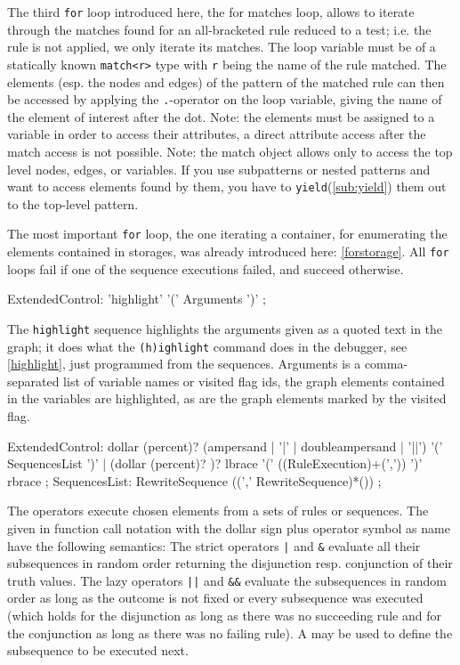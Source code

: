 The third \texttt{for} loop introduced here, the for matches loop, allows to iterate through the matches found for an all-bracketed rule reduced to a test; i.e. the rule is not applied, we only iterate its matches.
The loop variable must be of a statically known \texttt{match<r>} type with \texttt{r} being the name of the rule matched.
The elements (esp. the nodes and edges) of the pattern of the matched rule can then be accessed by applying the \texttt{.}-operator on the loop variable, giving the name of the element of interest after the dot.
Note: the elements must be assigned to a variable in order to access their attributes, a direct attribute access after the match access is not possible.
Note: the match object allows only to access the top level nodes, edges, or variables.
If you use subpatterns or nested patterns and want to access elements found by them, you have to \texttt{yield}(\ref{sub:yield}) them out to the top-level pattern.

The most important \texttt{for} loop, the one iterating a container, for enumerating the elements contained in storages, was already introduced here: \ref{forstorage}.
All \texttt{for} loops fail if one of the sequence executions failed, and succeed otherwise.

\begin{rail}
  ExtendedControl:
		'highlight' '(' Arguments ')'
    ;
\end{rail}
The \texttt{highlight} sequence highlights the arguments given as a quoted text in the graph;
it does what the \texttt{(h)ighlight} command does in the debugger, see \ref{highlight}, just programmed from the sequences. 
Arguments is a comma-separated list of variable names or visited flag ids, the graph elements contained in the variables are highlighted, as are the graph elements marked by the visited flag.

\begin{rail} 
  ExtendedControl: 
	dollar (percent)? (ampersand | '|' | doubleampersand | '||') '(' SequencesList ')' |
	(dollar (percent)? )? lbrace '(' ((RuleExecution)+(',')) ')' rbrace
	;
  SequencesList:
	RewriteSequence ((',' RewriteSequence)*())
	;
\end{rail}

The  operators execute chosen elements from a sets of rules or sequences.
The  given in function call notation with the dollar sign plus operator symbol as name have the following semantics:
The strict operators \verb/|/ and \verb/&/ evaluate all their subsequences in random order returning the disjunction resp. conjunction of their truth values.
The lazy operators \verb/||/ and \verb/&&/ evaluate the subsequences in random order as long as the outcome is not fixed or every subsequence was executed 
(which holds for the disjunction as long as there was no succeeding rule and for the conjunction as long as there was no failing rule).
A  may be used to define the subsequence to be executed next.

